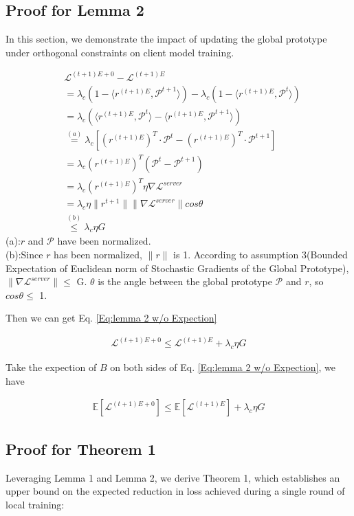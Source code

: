 \subsection{Proof for Lemma 2}
In this section, we demonstrate the impact of updating the global prototype under orthogonal constraints on client model training.

\begin{align}
&\mathcal{L}^{(t+1)E+0} - \mathcal{L}^{(t+1)E} \\
&= \lambda_c(1 - \langle r^{(t+1)E}, \mathcal{P}^{t+1}\rangle) - \lambda_c(1 - \langle r^{(t+1)E}, \mathcal{P}^{t}\rangle)\\
&= \lambda_c(\langle r^{(t+1)E}, \mathcal{P}^{t}\rangle - \langle r^{(t+1)E}, \mathcal{P}^{t+1}\rangle)\\
&\stackrel{(a)}{=} \lambda_c[(r^{(t+1)E})^T \cdot \mathcal{P}^t - (r^{(t+1)E})^T \cdot \mathcal{P}^{t+1}]\\
&= \lambda_c (r^{(t+1)E})^T (\mathcal{P}^t - \mathcal{P}^{t+1})\\
&= \lambda_c (r^{(t+1)E})^T \eta \nabla\mathcal{L}^{server}\\
&= \lambda_c \eta \|r^{t+1}\|\|\nabla\mathcal{L}^{server}\|cos\theta\\
&\stackrel{(b)}{\le} \lambda_c \eta G
\end{align}
(a):$r$ and $\mathcal{P}$ have been normalized.\\
(b):Since $r$ has been normalized, $\|r\|$ is 1. According to assumption 3(Bounded Expectation of Euclidean norm of Stochastic Gradients of the Global Prototype), $\|\nabla\mathcal{L}^{server}\| \le$ G. $\theta$ is the angle between the global prototype $\mathcal{P}$ and $r$, so $cos\theta \le$ 1.

Then we can get Eq. \ref{Eq:lemma 2 w/o Expection}

\begin{align}
    \mathcal{L}^{(t+1)E+0} \le \mathcal{L}^{(t+1)E} + \lambda_c \eta G
    \label{Eq:lemma 2 w/o Expection}
\end{align}

Take the expection of $B$ on both sides of Eq. \ref{Eq:lemma 2 w/o Expection}, we have

\begin{align}
    \mathbb{E}[\mathcal{L}^{(t+1)E+0}] \le \mathbb{E}[\mathcal{L}^{(t+1)E}] + \lambda_c \eta G
\end{align}

\subsection{Proof for Theorem 1}
Leveraging Lemma 1 and Lemma 2, we derive Theorem 1, which establishes an upper bound on the expected reduction in loss achieved during a single round of local training:


